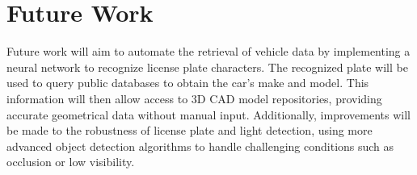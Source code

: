 \section{Future Work}

Future work will aim to automate the retrieval of vehicle data by implementing a neural network to recognize license plate characters. The recognized plate will be used to query public databases to obtain the car's make and model. This information will then allow access to 3D CAD model repositories, providing accurate geometrical data without manual input. Additionally, improvements will be made to the robustness of license plate and light detection, using more advanced object detection algorithms to handle challenging conditions such as occlusion or low visibility.

